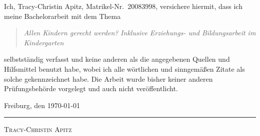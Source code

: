 Ich, Tracy-Christin Apitz, Matrikel-Nr.\ 20083998, versichere hiermit, dass ich meine Bachelorarbeit mit dem Thema
\begin{quote}
\textit{Allen Kindern gerecht werden?} \textit{Inklusive Erziehungs- und Bildungsarbeit im Kindergarten}
\end{quote}
selbstständig verfasst und keine anderen als die angegebenen Quellen und Hilfsmittel benutzt habe, wobei ich alle wörtlichen und sinngemäßen Zitate als solche gekennzeichnet habe. Die Arbeit wurde bisher keiner anderen Prüfungsbehörde vorgelegt und auch nicht veröffentlicht.

Freiburg, den \today 
\newline

\rule[-0.2cm]{5cm}{0.5pt}

\textsc{Tracy-Christin Apitz} 


